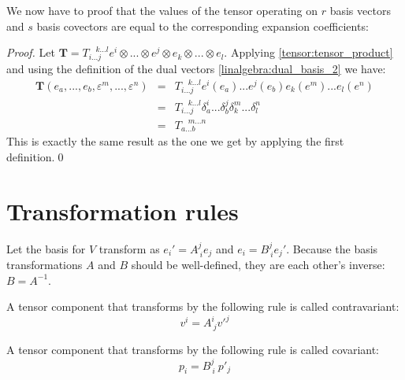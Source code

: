     
    	We now have to proof that the values of the tensor operating on $r$ basis vectors and $s$ basis covectors are equal to the corresponding expansion coefficients:
      	\begin{proof}
        	Let $\mathbf{T} = T_{i...j}^{\ \ \ \ k...l}e^i\otimes...\otimes e^j\otimes e_k\otimes...\otimes e_l$. Applying \ref{tensor:tensor_product} and using the definition of the dual vectors \ref{linalgebra:dual_basis_2} we have:
		\[
            	\begin{array}{ccl}
            		\mathbf{T}(e_a, ..., e_b, \varepsilon^m, ..., \varepsilon^n) &=& T_{i...j}^{\ \ \ \ k...l}e^i(e_a)...e^j(e_b)e_k(e^m)...e_l(e^n)\\
                	&=& T_{i...j}^{\ \ \ \ k...l}\delta_a^i...\delta_b^j\delta_k^m...\delta_l^n\\
                	&=& T_{a...b}^{\ \ \ \ m...n}
	        \end{array}
		\]
		This is exactly the same result as the one we get by applying the first definition.\qed
      	\end{proof}

\section{Transformation rules}

	Let the basis for $V$ transform as $e_i' = A^j_{\ i}e_j$ and $e_i = B^j_{\ i}e_j'$. Because the basis transformations $A$ and $B$ should be well-defined, they are each other's inverse: $B = A^{-1}$.

	\begin{definition}[Contravariant]
		A tensor component that transforms by the following rule is called contravariant:
	        \begin{equation}
			\label{tensorcalculus:contravariant}
		        v^i = A^i_{\ j}v'^j
		\end{equation}
	\end{definition}
    
	\begin{definition}[Covariant]
		A tensor component that transforms by the following rule is called covariant:
	        \begin{equation}
			\label{tensorcalculus:covariant}
		        p_i = B^j_{\ i}\ p'_j
		\end{equation}
	\end{definition}
    
